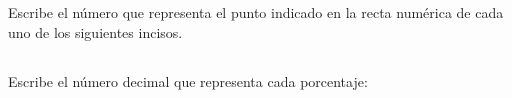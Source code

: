 \documentclass[12pt,addpoints,answers]{evalua}
\begin{document}
\begin{questions}
    \section*{\else{}\fi}

    \subsection*{\else{}\fi}

    \question[4] Escribe el número que representa el punto indicado en la recta numérica de cada uno de los siguientes incisos.

    \begin{multicols}{2}
    \end{multicols}

    \subsection*{\else{}\fi}

    \question[4] Escribe el número decimal que representa cada porcentaje:

    \begin{multicols}{2}
        \begin{parts}

\end{parts}
\end{multicols}
\end{questions}
\end{document}
